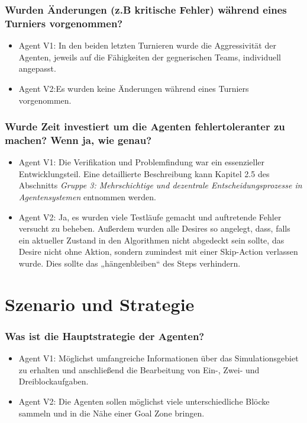 \documentclass[runningheads]{llncs}
\newcommand{\refMain}{{\textit{Gruppe 3: Mehrschichtige und dezentrale Entscheidungsprozesse in Agentensystemen }}}
\begin{document}
	\subsubsection{Wurden Änderungen (z.B kritische Fehler) während eines Turniers vorgenommen?}
	\begin{itemize}
		\item Agent V1: In den beiden letzten Turnieren wurde die Aggressivität der Agenten, jeweils auf die Fähigkeiten der gegnerischen Teams, individuell angepasst.
		\item Agent V2:Es wurden keine Änderungen während eines Turniers vorgenommen.
	\end{itemize}
	
	\subsubsection{Wurde Zeit investiert um die Agenten fehlertoleranter zu machen? Wenn ja, wie genau?}
	\begin{itemize}
		\item Agent V1: Die Verifikation und Problemfindung war ein essenzieller Entwicklungsteil. Eine detaillierte Beschreibung kann Kapitel 2.5 des Abschnitts \refMain entnommen werden.
		\item Agent V2: Ja, es wurden viele Testläufe gemacht und auftretende Fehler versucht zu beheben. Außerdem wurden alle Desires so angelegt, dass, falls ein aktueller Zustand in den Algorithmen nicht abgedeckt sein sollte, das Desire nicht ohne Aktion, sondern zumindest mit einer Skip-Action verlassen wurde. Dies sollte das „hängenbleiben“ des Steps verhindern.
	\end{itemize}
	
	\section{Szenario und Strategie}
	\subsubsection{Was ist die Hauptstrategie der Agenten?}
	\begin{itemize}
		\item Agent V1: Möglichst umfangreiche Informationen über das Simulationsgebiet zu erhalten und anschließend die Bearbeitung von Ein-, Zwei- und Dreiblockaufgaben.
		\item Agent V2: Die Agenten sollen möglichst viele unterschiedliche Blöcke sammeln und in die Nähe einer Goal Zone bringen.
	\end{itemize}
	
\end{document}
